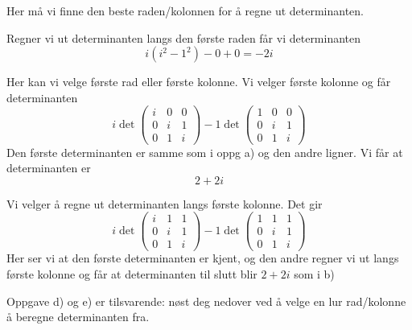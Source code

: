 \begin{losning}
	Her må vi finne den beste raden/kolonnen for å regne ut determinanten.
	\begin{punkt}	%
		Regner vi ut determinanten langs den første raden får vi determinanten
		\begin{equation*}
			i(i^2 - 1^2)  - 0 + 0 = -2i
		\end{equation*}
	\end{punkt}
	\begin{punkt}	%
		Her kan vi velge første rad eller første kolonne. Vi velger første kolonne og får determinanten
		\begin{equation*}
			i\det 
			\begin{pmatrix}
				i & 0 & 0 \\
				0 & i & 1 \\
				0 & 1 & i
			\end{pmatrix}
			-1\det
			\begin{pmatrix}
				1 & 0 & 0 \\
				0 & i & 1 \\
				0 & 1 & i
			\end{pmatrix}
		\end{equation*}
		Den første determinanten er samme som i oppg a) og den andre ligner. Vi får at determinanten er
		\begin{equation*}
			2 + 2i
		\end{equation*}
	\end{punkt}

	\begin{punkt}
		Vi velger å regne ut determinanten langs første kolonne. Det gir
		\begin{equation*}
			i\det\begin{pmatrix}
				i & 1 & 1 \\
				0 & i & 1 \\
				0 & 1 & i
			\end{pmatrix}
			-1\det\begin{pmatrix}
				1 & 1 & 1 \\
				0 & i & 1 \\
				0 & 1 & i
			\end{pmatrix}
		\end{equation*}
		Her ser vi at den første determinanten er kjent, og den andre regner vi ut langs første kolonne og får at determinanten til slutt blir $2 + 2i$ som i b)
	\end{punkt}
	Oppgave d) og e) er tilsvarende: nøst deg nedover ved å velge en lur rad/kolonne å beregne determinanten fra.
\end{losning}

